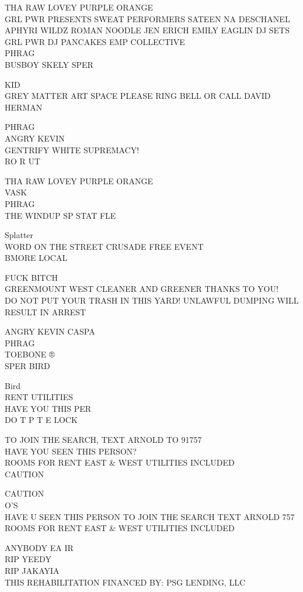 \documentclass[10pt,letterpaper]{article}
\begin{document}
THA RAW LOVEY PURPLE ORANGE\\
GRL PWR PRESENTS SWEAT PERFORMERS SATEEN  NA DESCHANEL APHYRI WILDZ ROMAN NOODLE JEN ERICH EMILY EAGLIN DJ SETS GRL PWR DJ PANCAKES EMP COLLECTIVE\\
PHRAG\\
BUSBOY SKELY SPER

KID\\
GREY MATTER ART SPACE PLEASE RING BELL OR CALL DAVID HERMAN

PHRAG\\
ANGRY KEVIN\\
GENTRIFY WHITE SUPREMACY!\\
RO R UT

THA RAW LOVEY PURPLE ORANGE\\
VASK\\
PHRAG\\
THE WINDUP SP STAT FLE

Splatter\\
WORD ON THE STREET CRUSADE FREE EVENT\\
BMORE LOCAL

FUCK BITCH\\
GREENMOUNT WEST CLEANER AND GREENER THANKS TO YOU!\\
DO NOT PUT YOUR TRASH IN THIS YARD!  UNLAWFUL DUMPING WILL RESULT IN ARREST

ANGRY KEVIN CASPA\\
PHRAG\\
TOEBONE ®\\
SPER BIRD

Bird\\
RENT UTILITIES\\
HAVE YOU THIS PER\\
DO T P T E LOCK

TO JOIN THE SEARCH, TEXT ARNOLD TO 91757\\
HAVE YOU SEEN THIS PERSON?\\
ROOMS FOR RENT EAST \& WEST UTILITIES INCLUDED\\
CAUTION

CAUTION\\
O'S\\
HAVE U SEEN THIS PERSON TO JOIN THE SEARCH TEXT ARNOLD 757\\
ROOMS FOR RENT EAST \& WEST UTILITIES INCLUDED

ANYBODY EA IR\\
RIP YEEDY\\
RIP JAKAYIA\\
THIS REHABILITATION FINANCED BY: PSG LENDING, LLC
\end{document}

